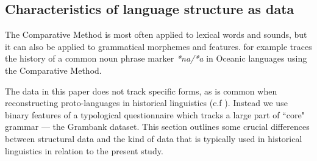 \documentclass[a4paper,10pt]{article} %
\begin{document}





\subsection{Characteristics of language structure as data}
\label{diff_lexi_str}

The Comparative Method is most often applied to lexical words and sounds, but it can also be applied to grammatical morphemes and features. \citet{crowley1985common} for example traces the history of a common noun phrase marker \emph{*na/*a} in Oceanic languages using the Comparative Method. 

The data in this paper does not track specific forms, as is common when reconstructing proto-languages in historical linguistics (c.f \citet{pawley1973some, crowley1985common, evans2003study}). Instead we use binary features of a typological questionnaire which tracks a large part of ``core" grammar --- the Grambank dataset. This section outlines some crucial differences between structural data and the kind of data that is typically used in historical linguistics in relation to the present study.
\end{document}
